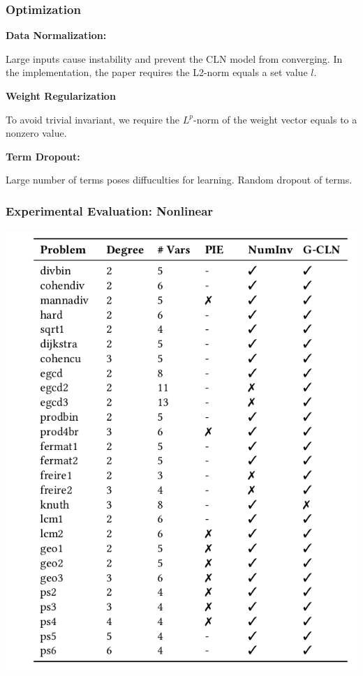 \documentclass[11pt]{beamer}
\begin{document}
\begin{frame}\frametitle{Optimization}
\textbf{Data Normalization:}

Large inputs cause instability and prevent the CLN model from converging. In the implementation, the paper requires the L2-norm equals a set value $l$.

\textbf{Weight Regularization}

To avoid trivial invariant, we require the $L^p$-norm of the weight vector equals to a nonzero value.

\textbf{Term Dropout:}

Large number of terms poses diffuculties for learning. Random dropout of terms.

\end{frame}

\begin{frame}\frametitle{Experimental Evaluation: Nonlinear}
\begin{center}
\includegraphics[scale=0.3]{12.png}
\end{center}
\end{frame}
\end{document}
